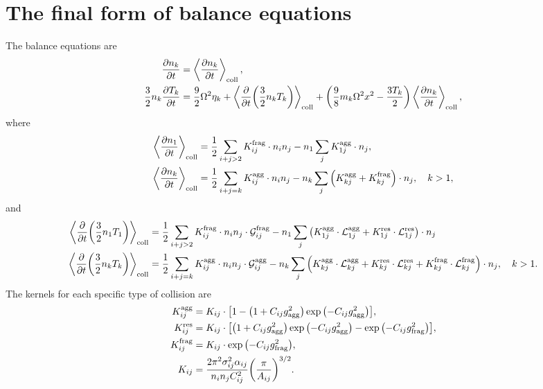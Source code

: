 \documentclass[aps,prl,preprint,groupedaddress,10pt]{revtex4-2}
\begin{document}
\section{The final form of balance equations}
The balance equations are
\begin{equation}
    \begin{split}
        \pdv{n_k}{t}&=\ltx{\avg{\pdv{n_k}{t}}}{coll},\\
        \frac{3}{2}n_k\pdv{T_k}{t}&=\frac{9}{2}\Omega^2\eta_k+
        \ltx{\avg{\pdv{t}\pqty{\frac{3}{2}n_kT_k}}}{coll}+
        \pqty{\frac{9}{8}m_k\Omega^2x^2-\frac{3T_k}{2}}\ltx{\avg{\pdv{n_k}{t}}}{coll},
    \end{split}
\end{equation}
where
\begin{equation}
    \begin{split}
        \ltx{\avg{\pdv{n_1}{t}}}{coll}&=\frac{1}{2}\sum_{i+j>2}\utx{K}{frag}_{ij}\cdot
        n_in_j-n_1\sum_{j}\utx{K}{agg}_{1j}\cdot n_j,\\
        \ltx{\avg{\pdv{n_k}{t}}}{coll}&=\frac{1}{2}\sum_{i+j=k}\utx{K}{agg}_{ij}\cdot
        n_in_j-n_k\sum_{j}\pqty{\utx{K}{agg}_{kj}+\utx{K}{frag}_{kj}}\cdot n_j,\quad k>1,
    \end{split}
\end{equation}
and
\begin{equation}
    \begin{split}
        \ltx{\avg{\pdv{t}\pqty{\frac{3}{2}n_1T_1}}}{coll}&=
        \frac{1}{2}\sum_{i+j>2}\utx{K}{frag}_{ij}\cdot n_in_j\cdot
        \utx{\mathcal{G}}{frag}_{ij}
        -n_1\sum_{j}\pqty{\utx{K}{agg}_{1j}\cdot \utx{\mathcal{L}}{agg}_{1j}
            +\utx{K}{res}_{1j}\cdot\utx{\mathcal{L}}{res}_{1j}}\cdot n_j\\
        \ltx{\avg{\pdv{t}\pqty{\frac{3}{2}n_kT_k}}}{coll}&=
        \frac{1}{2}\sum_{i+j=k}\utx{K}{agg}_{ij}\cdot n_in_j\cdot
        \utx{\mathcal{G}}{agg}_{ij}-
        n_k\sum_{j}\pqty{\utx{K}{agg}_{kj}\cdot\utx{\mathcal{L}}{agg}_{kj}+
            \utx{K}{res}_{kj}\cdot\utx{\mathcal{L}}{res}_{kj}+
            \utx{K}{frag}_{kj}\cdot\utx{\mathcal{L}}{frag}_{kj}}\cdot n_j,\quad k>1.
    \end{split}
\end{equation}
The kernels for each specific type of collision are
\begin{equation}
    \begin{split}
        \utx{K}{agg}_{ij}&=K_{ij}\cdot\bqty{1-\pqty{1+C_{ij}\ltx{g}{agg}^2}
        \exp\pqty{-C_{ij}\ltx{g}{agg}^2}},\\
        \utx{K}{res}_{ij}&=K_{ij}\cdot\bqty{\pqty{1+C_{ij}\ltx{g}{agg}^2}
        \exp\pqty{-C_{ij}\ltx{g}{agg}^2}-\exp\pqty{-C_{ij}\ltx{g}{frag}^2}},\\
        \utx{K}{frag}_{ij}&=K_{ij}\cdot\exp\pqty{-C_{ij}\ltx{g}{frag}^2},\\
        K_{ij}&=\frac{2\pi^2\sigma_{ij}^2\alpha_{ij}}{n_in_jC_{ij}^2}
        \pqty{\frac{\pi}{A_{ij}}}^{3/2}.
    \end{split}
\end{equation}
\end{document}
